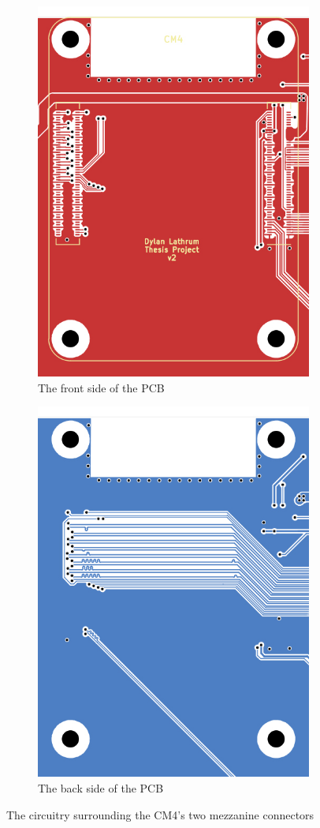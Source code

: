 \begin{figure}[t]
  \centering
  \begin{subfigure}{.5\textwidth}
    \centering
    \includegraphics[width=.75\linewidth]{Figures/kicad/close-ups/cm4-front}
    \caption{The front side of the PCB}
    \label{fig:CM4CircuitFront}
  \end{subfigure}%
  \begin{subfigure}{.5\textwidth}
    \centering
    \includegraphics[width=.75\linewidth]{Figures/kicad/close-ups/cm4-back}
    \caption{The back side of the PCB}
    \label{fig:CM4CircuitBack}
  \end{subfigure}
  \caption{The circuitry surrounding the CM4's two mezzanine connectors}
  \label{fig:CM4Circuit}
\end{figure}


